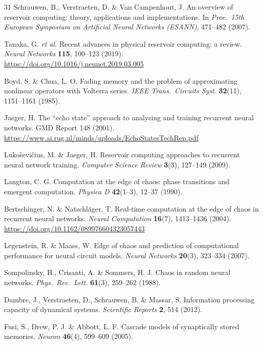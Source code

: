 \documentclass[11pt]{article}
\begin{document}
\begin{thebibliography}{31}
 Schrauwen, B., Verstraeten, D. \& Van Campenhout, J.
An overview of reservoir computing: theory, applications and implementations.
In \emph{Proc.\ 15th European Symposium on Artificial Neural Networks
(ESANN)}, 471--482 (2007).

 Tanaka, G. \emph{et al.} Recent advances in physical
reservoir computing: a review. \emph{Neural Networks} \textbf{115}, 100--123
(2019). \url{https://doi.org/10.1016/j.neunet.2019.03.005}

 Boyd, S. \& Chua, L. O. Fading memory and the problem of
approximating nonlinear operators with Volterra series.
\emph{IEEE Trans.\ Circuits Syst.} \textbf{32}(11), 1151--1161 (1985).

 Jaeger, H. The ``echo state'' approach to analysing and
training recurrent neural networks. GMD Report 148 (2001).
\url{https://www.ai.rug.nl/minds/uploads/EchoStatesTechRep.pdf}

 Luko\v{s}evi\v{c}ius, M. \& Jaeger, H. Reservoir
computing approaches to recurrent neural network training. \emph{Computer
Science Review} \textbf{3}(3), 127--149 (2009).

 Langton, C. G. Computation at the edge of chaos: phase
transitions and emergent computation. \emph{Physica D} \textbf{42}(1--3),
12--37 (1990).

 Bertschinger, N. \& Natschläger, T. Real-time
computation at the edge of chaos in recurrent neural networks.
\emph{Neural Computation} \textbf{16}(7), 1413--1436 (2004).
\url{https://doi.org/10.1162/089976604323057443}

 Legenstein, R. \& Maass, W. Edge of chaos and
prediction of computational performance for neural circuit models.
\emph{Neural Networks} \textbf{20}(3), 323--334 (2007).

 Sompolinsky, H., Crisanti, A. \& Sommers, H. J.
Chaos in random neural networks. \emph{Phys.\ Rev.\ Lett.} \textbf{61}(3),
259--262 (1988).

 Dambre, J., Verstraeten, D., Schrauwen, B. \& Massar, S.
Information processing capacity of dynamical systems.
\emph{Scientific Reports} \textbf{2}, 514 (2012).

 Fusi, S., Drew, P. J. \& Abbott, L. F. Cascade models of
synaptically stored memories. \emph{Neuron} \textbf{46}(4), 599--609 (2005).


\end{thebibliography}
\end{document}
